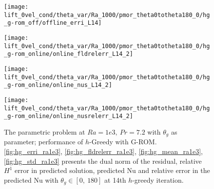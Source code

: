 \begin{figure}[h!]
    \begin{minipage}[b]{.25\linewidth}
        \centering \texttt{[image: lift\_0vel\_cond/theta\_var/Ra\_1000/pmor\_theta0totheta180\_0/hg\_g-rom\_off/offline\_erri\_L14]}
        \label{fig:hg_erri_ra1e3}
    \end{minipage}%
    \begin{minipage}[b]{.25\linewidth}
        \centering \texttt{[image: lift\_0vel\_cond/theta\_var/Ra\_1000/pmor\_theta0totheta180\_0/hg\_g-rom\_online/online\_fldrelerr\_L14\_2]}
        \label{fig:hg_fldrelerr_ra1e3}
    \end{minipage}
    \begin{minipage}[b]{.25\linewidth}
        \centering \texttt{[image: lift\_0vel\_cond/theta\_var/Ra\_1000/pmor\_theta0totheta180\_0/hg\_g-rom\_online/online\_nus\_L14\_2]}
        \label{fig:hg_mean_ra1e3}
    \end{minipage}%
    \begin{minipage}[b]{.25\linewidth}
        \centering \texttt{[image: lift\_0vel\_cond/theta\_var/Ra\_1000/pmor\_theta0totheta180\_0/hg\_g-rom\_online/online\_nusrelerr\_L14\_2]}
        \label{fig:hg_std_ra1e3}
    \end{minipage} \caption{The parametric problem at $Ra=1e3,~Pr=7.2$ with
    $\theta_g$ as parameter; performance of $h$-Greedy with G-ROM.
    \ref{fig:hg_erri_ra1e3}, \ref{fig:hg_fldrelerr_ra1e3},
    \ref{fig:hg_mean_ra1e3}, \ref{fig:hg_std_ra1e3} presents the dual
    norm of the residual, relative $H^1$ error in predicted solution, predicted Nu and relative
    error in the predicted Nu with $\theta_g \in [0,~180]$ at 14th $h$-greedy iteration.}
    \label{fig:hg_online_ra1e3} 
\end{figure}
